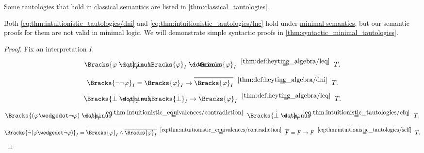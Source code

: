 \begin{comments}
  \item Some tautologies that hold in \hyperref[def:propositional_semantics/classical]{classical semantics} are listed in \cref{thm:classical_tautologies}.
  \item Both \eqref{eq:thm:intuitionistic_tautologies/dni} and \eqref{eq:thm:intuitionistic_tautologies/lnc} hold under \hyperref[def:minimal_propositional_semantics]{minimal semantics}, but our semantic proofs for them are not valid in minimal logic. We will demonstrate simple syntactic proofs in \cref{thm:syntactic_minimal_tautologies}.
\end{comments}
\begin{proof}
  Fix an interpretation \( I \).

  \begin{equation*}
    \Bracks{\varphi \synimplies \varphi}_I
    =
    \Bracks{\varphi}_I \synimplies \Bracks{\varphi}_I
    \reloset {\ref{thm:def:heyting_algebra/leq}} =
    T.
  \end{equation*}

  \begin{equation*}
    \Bracks{\neg \neg \varphi}_I
    =
    \Bracks{\varphi}_I \rightarrow \oline{\oline{\Bracks{\varphi}_I}}
    \reloset {\ref{thm:def:heyting_algebra/dni}} =
    T.
  \end{equation*}

  \begin{equation*}
    \Bracks{\synbot \synimplies \varphi}_I
    =
    \Bracks{\synbot}_I \rightarrow \Bracks{\varphi}_I
    \reloset {\ref{thm:def:heyting_algebra/leq}} =
    T.
  \end{equation*}

  \begin{equation*}
    \Bracks{(\varphi \synwedge \neg \varphi) \synimplies \psi}_I
    \reloset {\eqref{eq:thm:intuitionistic_equivalences/contradiction}} =
    \Bracks{\synbot \synimplies \psi}_I
    \reloset {\eqref{eq:thm:intuitionistic_tautologies/efq}} =
    T.
  \end{equation*}

  \begin{equation*}
    \Bracks{\synneg (\varphi \synwedge \synneg \varphi)}_I
    =
    \oline{\Bracks{\varphi}_I \wedge \oline{\Bracks{\varphi}_I}}
    \reloset {\eqref{eq:thm:intuitionistic_equivalences/contradiction}} =
    \oline{F}
    =
    F \rightarrow F
    \reloset {\eqref{eq:thm:intuitionistic_tautologies/self}} =
    T.
  \end{equation*}
\end{proof}

